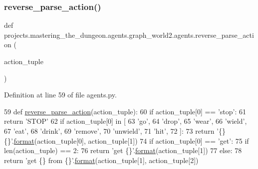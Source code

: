 \subsubsection{\texorpdfstring{reverse\+\_\+parse\+\_\+action()}{reverse\_parse\_action()}}
{\footnotesize\ttfamily def projects.\+mastering\+\_\+the\+\_\+dungeon.\+agents.\+graph\+\_\+world2.\+agents.\+reverse\+\_\+parse\+\_\+action (\begin{DoxyParamCaption}\item[{}]{action\+\_\+tuple }\end{DoxyParamCaption})}



Definition at line 59 of file agents.\+py.


\begin{DoxyCode}
59 \textcolor{keyword}{def }\hyperlink{namespaceprojects_1_1mastering__the__dungeon_1_1agents_1_1graph__world2_1_1agents_acfdb3e0a43d2dee8909bf189d4988739}{reverse\_parse\_action}(action\_tuple):
60     \textcolor{keywordflow}{if} action\_tuple[0] == \textcolor{stringliteral}{'stop'}:
61         \textcolor{keywordflow}{return} \textcolor{stringliteral}{'STOP'}
62     \textcolor{keywordflow}{if} action\_tuple[0] \textcolor{keywordflow}{in} [
63         \textcolor{stringliteral}{'go'},
64         \textcolor{stringliteral}{'drop'},
65         \textcolor{stringliteral}{'wear'},
66         \textcolor{stringliteral}{'wield'},
67         \textcolor{stringliteral}{'eat'},
68         \textcolor{stringliteral}{'drink'},
69         \textcolor{stringliteral}{'remove'},
70         \textcolor{stringliteral}{'unwield'},
71         \textcolor{stringliteral}{'hit'},
72     ]:
73         \textcolor{keywordflow}{return} \textcolor{stringliteral}{'\{\} \{\}'}.\hyperlink{namespaceparlai_1_1chat__service_1_1services_1_1messenger_1_1shared__utils_a32e2e2022b824fbaf80c747160b52a76}{format}(action\_tuple[0], action\_tuple[1])
74     \textcolor{keywordflow}{if} action\_tuple[0] == \textcolor{stringliteral}{'get'}:
75         \textcolor{keywordflow}{if} len(action\_tuple) == 2:
76             \textcolor{keywordflow}{return} \textcolor{stringliteral}{'get \{\}'}.\hyperlink{namespaceparlai_1_1chat__service_1_1services_1_1messenger_1_1shared__utils_a32e2e2022b824fbaf80c747160b52a76}{format}(action\_tuple[1])
77         \textcolor{keywordflow}{else}:
78             \textcolor{keywordflow}{return} \textcolor{stringliteral}{'get \{\} from \{\}'}.\hyperlink{namespaceparlai_1_1chat__service_1_1services_1_1messenger_1_1shared__utils_a32e2e2022b824fbaf80c747160b52a76}{format}(action\_tuple[1], action\_tuple[2])

\end{DoxyCode}

